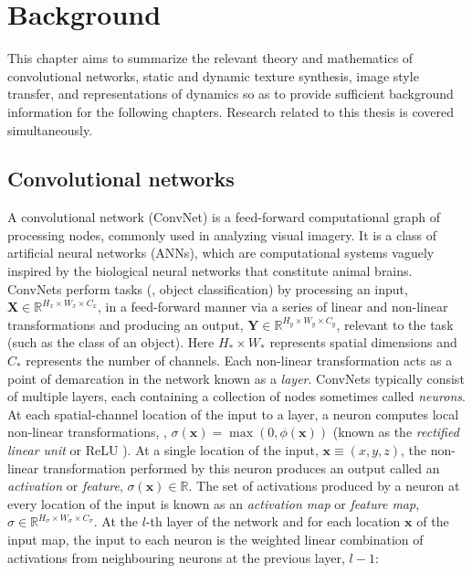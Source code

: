 \chapter{Background}\label{chap:background}

This chapter aims to summarize the relevant theory and mathematics of
convolutional networks,
static and dynamic texture synthesis, image style transfer, and representations of dynamics so as to provide sufficient
background information for the following chapters. Research
related to this thesis is covered simultaneously.

\section{Convolutional networks}

A convolutional network (ConvNet) is a feed-forward computational graph of processing nodes, commonly used in analyzing visual imagery. It is a class of artificial neural networks (ANNs), which are computational systems vaguely inspired by the biological neural networks that constitute animal brains. ConvNets perform tasks (\eg, object classification) by processing an input, $\mathbf{X} \in \mathbb{R}^{H_x \times W_x \times C_x}$, in a feed-forward manner via a series of linear and non-linear transformations and producing an output, $\mathbf{Y} \in \mathbb{R}^{H_y \times W_y \times C_y}$, relevant to the task (such as the class of an object). Here $H_\ast \times W_\ast$ represents spatial dimensions and $C_\ast$ represents the  number of channels. Each non-linear transformation acts as a point of demarcation in the network known as a \emph{layer}. ConvNets typically consist of multiple layers, each containing a collection of nodes sometimes called \emph{neurons}. At each spatial-channel location of the input to a layer, a neuron computes local non-linear transformations, \eg, $\sigma(\mathbf{x}) = \max{(0, \phi(\mathbf{x}))}$ (known as the \emph{rectified linear unit} or ReLU \cite{nair2010rectified}). At a single location of the input, $\mathbf{x} \equiv (x, y, z)$, the non-linear transformation performed by this neuron produces an output called an \emph{activation} or \emph{feature}, $\sigma(\mathbf{x}) \in \mathbb{R}$. The set of activations produced by a neuron at every location of the input is known as an \emph{activation map} or \emph{feature map}, $\sigma \in \mathbb{R}^{H_\sigma \times W_\sigma \times C_\sigma}$. At the $l$-th layer of the network and for each location $\mathbf{x}$ of the input map, the input to each neuron is the weighted linear combination of activations from neighbouring neurons at the previous layer, $l-1$:
